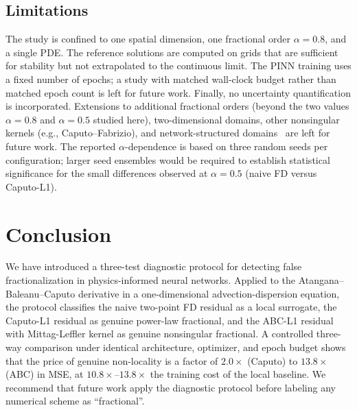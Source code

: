 \documentclass[11pt]{article}
\begin{document}
\subsection{Limitations}
\label{sec:limitations}

The study is confined to one spatial dimension, one fractional order \(\alpha=0.8\), and a single PDE. The reference solutions are computed on grids that are sufficient for stability but not extrapolated to the continuous limit. The PINN training uses a fixed number of epochs; a study with matched wall-clock budget rather than matched epoch count is left for future work. Finally, no uncertainty quantification is incorporated. Extensions to additional fractional orders (beyond the two
values \(\alpha=0.8\) and \(\alpha=0.5\) studied here), two-dimensional domains, other nonsingular
kernels (e.g., Caputo--Fabrizio), and network-structured domains~\cite{Mehandiratta2025} are left for future work. The reported
\(\alpha\)-dependence is based on three random seeds per configuration;
larger seed ensembles would be required to establish statistical
significance for the small differences observed at \(\alpha=0.5\)
(naive FD versus Caputo-L1).

\section{Conclusion}
\label{sec:conclusion}

We have introduced a three-test diagnostic protocol for detecting false fractionalization in physics-informed neural networks. Applied to the Atangana--Baleanu--Caputo derivative in a one-dimensional advection-dispersion equation, the protocol classifies the naive two-point FD residual as a local surrogate, the Caputo-L1 residual as genuine power-law fractional, and the ABC-L1 residual with Mittag-Leffler kernel as genuine nonsingular fractional. A controlled three-way comparison under identical architecture, optimizer, and epoch budget shows that the price of genuine non-locality is a factor of \(2.0\times\) (Caputo) to \(13.8\times\) (ABC) in MSE, at \(10.8\times\)--\(13.8\times\) the training cost of the local baseline. We recommend that future work apply the diagnostic protocol before labeling any numerical scheme as ``fractional''.

\end{document}
